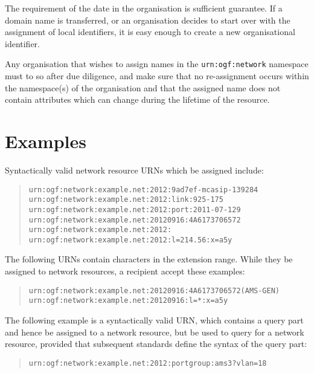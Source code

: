 \documentclass[12pt]{article}  %
\begin{document}
The requirement of the date in the organisation is sufficient guarantee.
If a domain name is transferred, or an organisation decides to start over 
with the assignment of local identifiers, it is easy enough to create a 
new organisational identifier.

Any organisation that wishes to assign names in the \texttt{urn:ogf:network} 
namespace must to so after due diligence, and make sure that no 
re-assignment occurs within the namespace(s) of the organisation and 
that the assigned name does not contain attributes which can change 
during the lifetime of the resource.

\section{Examples}

Syntactically valid network resource URNs which \MAY{} be assigned include:
\begin{quote}
\texttt{urn:ogf:network:example.net:2012:9ad7ef-mcasip-139284} \\
\texttt{urn:ogf:network:example.net:2012:link:925-175} \\
\texttt{urn:ogf:network:example.net:2012:port:2011-07-129} \\
\texttt{urn:ogf:network:example.net:20120916:4A6173706572} \\
\texttt{urn:ogf:network:example.net:2012:} \\
\texttt{urn:ogf:network:example.net:2012:l=214.56:x=a5y}
\end{quote}

The following URNs contain characters in the extension range. While they \SHOULDNOT{} be assigned to network resources, a recipient \SHOULD{} accept these examples:
\begin{quote}
\texttt{urn:ogf:network:example.net:20120916:4A6173706572(AMS-GEN)} \\
\texttt{urn:ogf:network:example.net:20120916:l=*:x=a5y} \\
\end{quote}
 
The following example is a syntactically valid URN, which contains a query 
part and hence \MUSTNOT{} be assigned to a network resource, but \MAY{} 
be used to query for a network resource, provided that subsequent standards 
define the syntax of the query part:
\begin{quote}
\texttt{urn:ogf:network:example.net:2012:portgroup:ams3?vlan=18}
\end{quote}
\end{document}
